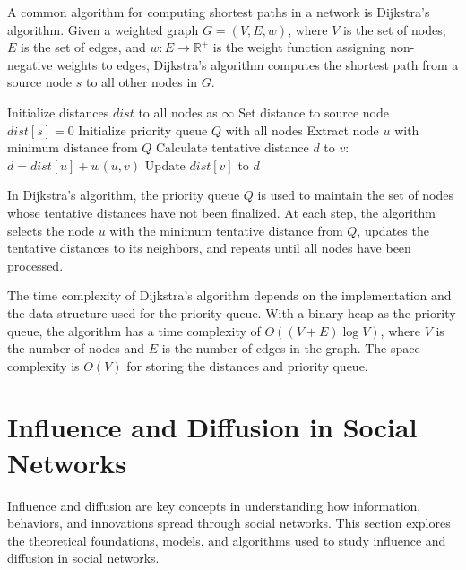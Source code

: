 \documentclass[12pt]{book} %
\begin{document}
A common algorithm for computing shortest paths in a network is Dijkstra's algorithm. Given a weighted graph \(G = (V, E, w)\), where \(V\) is the set of nodes, \(E\) is the set of edges, and \(w : E \rightarrow \mathbb{R}^+\) is the weight function assigning non-negative weights to edges, Dijkstra's algorithm computes the shortest path from a source node \(s\) to all other nodes in \(G\).
\FloatBarrier
\begin{algorithm}[H]
\caption{Dijkstra's Algorithm}
\begin{algorithmic}[1]
    \State Initialize distances $dist$ to all nodes as $\infty$
    \State Set distance to source node $dist[s] = 0$
    \State Initialize priority queue $Q$ with all nodes
        \State Extract node $u$ with minimum distance from $Q$
            \State Calculate tentative distance $d$ to $v$: $d = dist[u] + w(u, v)$
                \State Update $dist[v]$ to $d$
            \EndIf
        \EndFor
    \EndWhile
\EndFunction
\end{algorithmic}
\end{algorithm}
\FloatBarrier
In Dijkstra's algorithm, the priority queue \(Q\) is used to maintain the set of nodes whose tentative distances have not been finalized. At each step, the algorithm selects the node \(u\) with the minimum tentative distance from \(Q\), updates the tentative distances to its neighbors, and repeats until all nodes have been processed.

The time complexity of Dijkstra's algorithm depends on the implementation and the data structure used for the priority queue. With a binary heap as the priority queue, the algorithm has a time complexity of \(O((V + E) \log V)\), where \(V\) is the number of nodes and \(E\) is the number of edges in the graph. The space complexity is \(O(V)\) for storing the distances and priority queue.

\section{Influence and Diffusion in Social Networks}

Influence and diffusion are key concepts in understanding how information, behaviors, and innovations spread through social networks. This section explores the theoretical foundations, models, and algorithms used to study influence and diffusion in social networks.
\end{document}
